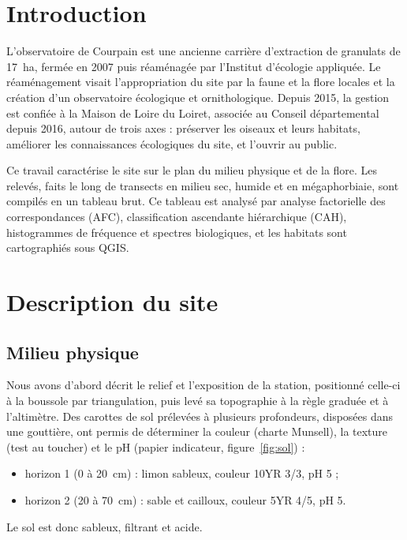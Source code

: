 \documentclass[11pt,a4paper]{article}
\begin{document}
\pagedegarde


\section{Introduction}
L'observatoire de Courpain est une ancienne carrière d'extraction de granulats de 17~ha, fermée en 2007 puis réaménagée par l'Institut d'écologie appliquée. Le réaménagement visait l'appropriation du site par la faune et la flore locales et la création d'un observatoire écologique et ornithologique. Depuis 2015, la gestion est confiée à la Maison de Loire du Loiret, associée au Conseil départemental depuis 2016, autour de trois axes : préserver les oiseaux et leurs habitats, améliorer les connaissances écologiques du site, et l'ouvrir au public.

Ce travail caractérise le site sur le plan du milieu physique et de la flore. Les relevés, faits le long de transects en milieu sec, humide et en mégaphorbiaie, sont compilés en un tableau brut. Ce tableau est analysé par analyse factorielle des correspondances (AFC), classification ascendante hiérarchique (CAH), histogrammes de fréquence et spectres biologiques, et les habitats sont cartographiés sous QGIS.

\section{Description du site}
\subsection{Milieu physique}
Nous avons d'abord décrit le relief et l'exposition de la station, positionné celle-ci à la boussole par triangulation, puis levé sa topographie à la règle graduée et à l'altimètre. Des carottes de sol prélevées à plusieurs profondeurs, disposées dans une gouttière, ont permis de déterminer la couleur (charte Munsell), la texture (test au toucher) et le pH (papier indicateur, figure~\ref{fig:sol}) :
\begin{itemize}
\item horizon 1 (0 à 20~cm) : limon sableux, couleur 10YR 3/3, pH 5 ;
\item horizon 2 (20 à 70~cm) : sable et cailloux, couleur 5YR 4/5, pH 5.
\end{itemize}
Le sol est donc sableux, filtrant et acide.
\end{document}
